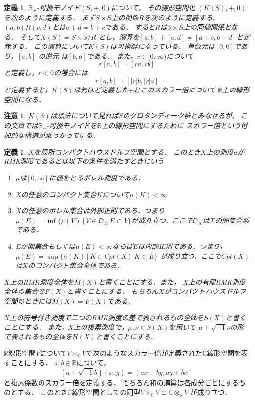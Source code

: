 \documentclass[leqno]{jsarticle}
\newtheorem{df}[thm]{定義}
\newtheorem*{cau}{注意}
\newcommand{\rr}{\mathbb{R}}
\newcommand{\cc}{\mathbb{C}}
\begin{document}
\begin{df}
$\rr_+$-可換モノイド$(S, +, 0)$について，
その線形空間化
$(K(S), +, 0)$を次のように定義する．
 まず$S\times S$上の関係$R$を次のように定義する．
  $(a, b)R(c, d)$とは$a+d=b+c$である．
  すると$R$は$S\times S$上の同値関係となる．
  そして$K(S)=S\times S/R$
  とし，演算を$[a, b]+[c, d]=[a+c, b+d]$と定義する．
 この演算について$K(S)$は可換群になっている．
 単位元は$[0, 0]$であり，$[a, b]$
 の逆元
 は$[b, a]$である．
 また，$r\in [0, \infty)$について
 \[
 r[a, b]=[ra, rb]
 \]
 と定義し，$r<0$の場合には
 \[
 r[a, b]=[|r|b, |r|a]
 \]
 と定義すると，$K(S)$は先ほど定義した$+$とこのスカラー倍について
 $\rr$上の線形空間になる．
 \end{df}

\begin{cau}
$K(S)$は加法について見れば$S$のグロタンディーク群とみなせるが，
この文章では$\rr_+$-可換モノイドを$\rr$上の線形空間にするために
スカラー倍という付加的な構造が乗っかっている．
\end{cau}


\begin{df}
$X$を局所コンパクトハウスドルフ空間とする．
このとき$X$上の測度$\mu$がRMK測度であるとは以下の条件を満たすときにいう
\begin{enumerate}
\item $\mu$は$[0, \infty]$に値をとるボレル測度である．
\item $X$の任意のコンパクト集合$K$について$\mu(K)<\infty$
\item $X$の任意のボレル集合は外部正則である．つまり
$\mu(E)=\inf\{\mu(V)\ |\ V\in \mathfrak{O}_X\ E\subset V\}$が成り立つ．ここで$\mathfrak{O}_X$は$X$の開集合系である．
\item $E$が開集合もしくは$\mu(E)<\infty$ならば$E$は内部正則である．つまり，
$\mu(E)=\sup\{\mu(K)\ |\ K\in Cpt(X) \ K\subset E\}$
が成り立つ．ここで$Cpt(X)$は$X$のコンパクト集合全体である．
\end{enumerate}

$X$上のRMK測度全体を$M(X)$と書くことにする．また，
$X$上の有限RMK測度全体の集合を$F(X)$と書くことにする．
もちろん$X$がコンパクトハウスドルフ空間のときには$M(X)=F(X)$である．

$X$上の符号付き測度で二つのRMK測度の差で表されるもの全体を$S(X)$と書くことにする．
また，$X$上の複素測度で，$\mu, \nu\in S(X)$を用いて
$\mu+\sqrt{-1}\nu$の形で表されるもの全体を$H(X)$と書くことにする．
\end{df}
$\rr$線形空間$V$について$V\times_{\cc} V$で次のようなスカラー倍が定義された$\cc$線形空間を表すことにする．
$a, b\in \rr$について，
\[
(a+\sqrt{-1}b)(x, y)=(ax-by, ay+bx)
\]
と複素係数のスカラー倍を定義する．
もちろん和の演算は各成分ごとにするものとする．
このとき$\cc$線形空間としての同型$V\times_{\cc}V\cong \cc\otimes_{\rr}V$
が成り立つ．
\end{document}
